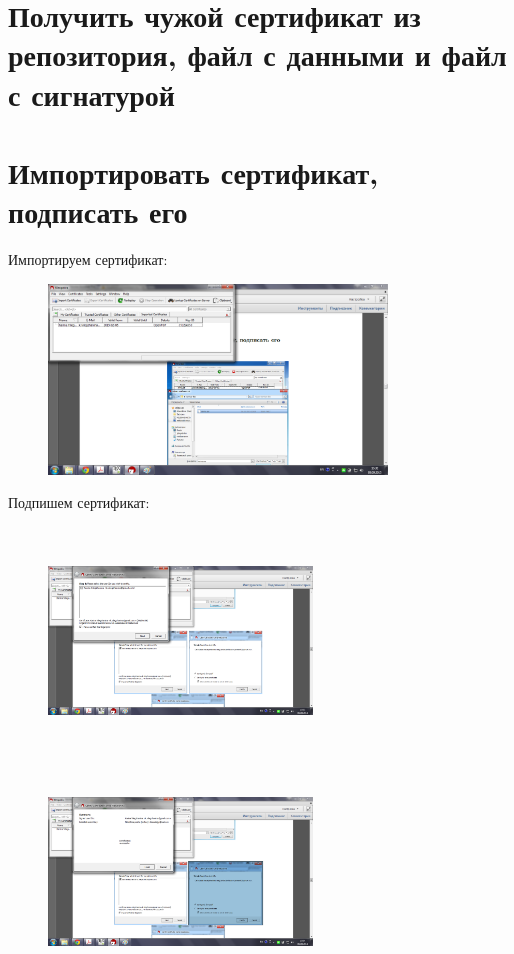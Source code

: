 \documentclass[utf8x, 12pt]{G7-32}
\begin{document}
\section{Получить чужой сертификат из репозитория, файл с данными и файл с сигнатурой}

	

\newpage

\section{Импортировать сертификат, подписать его}

Импортируем сертификат:
\begin{figure}[hhh!]
	\begin{center}
		\includegraphics[width=9cm]{img2/25}
	\end{center}
\end{figure}	


Подпишем сертификат:
\begin{figure}[hhh!]
	\begin{center}
		\includegraphics[width=7cm, height=6cm]{img2/252}
		\includegraphics[width=7cm, height=6cm]{img2/253}
		
	\end{center}
\end{figure}	
\end{document}

